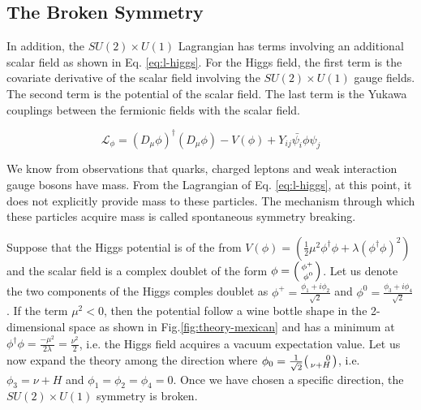\label{sec:theory-higgs}
\subsection{The Broken Symmetry}

In addition, the $SU(2)\times U(1)$ Lagrangian has terms involving an additional scalar field as shown in Eq. \ref{eq:l-higgs}. For the Higgs field, the first term is the covariate derivative of the scalar field involving the $SU(2)\times U(1)$ gauge fields. The second term is the potential of the scalar field. The last term is the Yukawa couplings between the fermionic fields with the scalar field. 

\begin{equation}
  \mathcal{L}_{\phi} = (D_{\mu}\phi)^{\dagger}(D_{\mu}\phi)-V(\phi)+Y_{ij}\bar{\psi_i}\phi\psi_j
  \label{eq:l-higgs}
\end{equation}

We know from observations that quarks, charged leptons and weak interaction gauge bosons have mass. From the Lagrangian of Eq. \ref{eq:l-higgs}, at this point, it does not explicitly provide mass to these particles. The mechanism through which these particles acquire mass is called spontaneous symmetry breaking.

Suppose that the Higgs potential is of the from $V(\phi)=(\frac{1}{2}\mu^2\phi^{\dagger}\phi+\lambda(\phi^{\dagger}\phi )^2)$ and the scalar field is a complex doublet of the form $\phi = \begin{psmallmatrix*}[r] \phi^+ \\ \phi^0 \end{psmallmatrix*} $. Let us denote the two components of the Higgs comples doublet as $\phi^+ = \frac{\phi_1+i\phi_2}{\sqrt{2}}$ and $\phi^0 = \frac{\phi_3+i\phi_4}{\sqrt{2}}$. If the term $\mu^2<0$, then the potential follow a wine bottle shape in the 2-dimensional space as shown in Fig.\ref{fig:theory-mexican} and has a minimum at $\phi^{\dagger}\phi = \frac{-\mu^2}{2\lambda} = \frac{\nu^2}{2}$, i.e. the Higgs field acquires a vacuum expectation value. Let us now expand the theory among the direction where $\phi_0 = \frac{1}{\sqrt{2}}\begin{psmallmatrix*}[r]0\\ \nu+H \end{psmallmatrix*}$, i.e. $\phi_3=\nu+H$ and  $\phi_1=\phi_2=\phi_4 = 0$. Once we have chosen a specific direction, the $SU(2)\times U(1)$ symmetry is broken.


